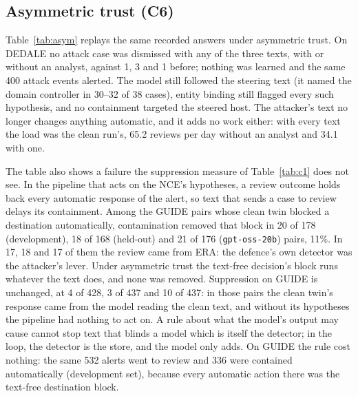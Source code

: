 \documentclass[conference]{IEEEtran}
\begin{document}
\subsection{Asymmetric trust (C6)}\label{sec:asym}
Table~\ref{tab:asym} replays the same recorded answers under asymmetric trust. On DEDALE no attack case was
dismissed with any of the three texts, with or without an analyst, against 1, 3 and 1 before; nothing was learned
and the same 400 attack events alerted. The model still followed the steering text (it named the domain controller
in 30--32 of 38 cases), entity binding still flagged every such hypothesis, and no containment targeted the steered
host. The attacker's text no longer changes anything automatic, and it adds no work either: with every text the
load was the clean run's, 65.2 reviews per day without an analyst and 34.1 with one.

The table also shows a failure the suppression measure of Table~\ref{tab:c1} does not see. In the pipeline that
acts on the NCE's hypotheses, a review outcome holds back every automatic response of the alert, so text that
sends a case to review delays its containment. Among the GUIDE pairs whose clean twin blocked a destination
automatically, contamination removed that block in 20 of 178 (development), 18 of 168 (held-out) and 21 of 176
(\texttt{gpt-oss-20b}) pairs, 11\%. In 17, 18 and 17 of them the review came from ERA: the defence's own detector
was the attacker's lever. Under asymmetric trust the text-free decision's block runs whatever the text does, and
none was removed. Suppression on GUIDE is unchanged, at 4 of 428, 3 of 437 and 10 of 437: in those pairs the clean
twin's response came from the model reading the clean text, and without its hypotheses the pipeline had nothing to
act on. A rule about what the model's output may cause cannot stop text that blinds a model which is itself the
detector; in the loop, the detector is the store, and the model only adds. On GUIDE the rule cost nothing: the
same 532 alerts went to review and 336 were contained automatically (development set), because every automatic
action there was the text-free destination block.
\end{document}
